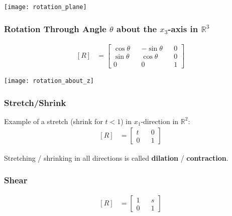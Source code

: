 \documentclass[a4paper,9pt]{extarticle}
\begin{document}
\begin{multicols*}{2}
{\centering \texttt{[image: rotation\_plane]} \par}


\subsubsection{Rotation Through Angle $\theta$ about the $x_3$-axis in $\mathbb{R}^3$}
\begin{equation} \label{3.3-3}
    \begin{split}
        [R] & = \begin{bmatrix}\cos{\theta} && -\sin{\theta} && 0 \\ \sin{\theta} && \cos{\theta} && 0 \\ 0 && 0 && 1\end{bmatrix}
    \end{split}
\end{equation}

{\centering \texttt{[image: rotation\_about\_z]} \par}


\subsubsection{Stretch/Shrink}
Example of a stretch (shrink for $t < 1$) in $x_1$-direction in $\mathbb{R}^2$:
\begin{equation} \label{3.3-4}
    \begin{split}
        [R] & = \begin{bmatrix}t && 0 \\ 0 && 1\end{bmatrix}
    \end{split}
\end{equation}

Stretching / shrinking in all directions is called \textbf{dilation} / \textbf{contraction}.


\subsubsection{Shear}
\begin{equation} \label{3.3-5}
    \begin{split}
        [R] & = \begin{bmatrix}1 && s \\ 0 && 1\end{bmatrix}
    \end{split}
\end{equation}


\end{multicols*}
\end{document}
